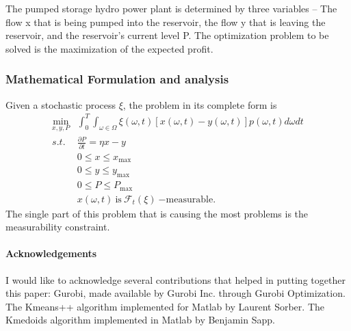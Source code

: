 \documentclass[a4paper, 12pt] {article}
\begin{document}
The pumped storage hydro power plant is determined by three variables – The flow x that is being pumped into the reservoir, the flow y that is leaving the reservoir, and the reservoir's current level P.  The optimization problem to be solved is the maximization of the expected profit. 
\subsubsection{Mathematical Formulation and analysis}
Given a stochastic process $\xi$, the problem in its complete form is
\begin{equation}
  \begin{array}{cc}
    \displaystyle \min_{x,y,P} &\displaystyle\int_0^T \int_{\omega \in\Omega}\xi(\omega,t)\left[x(\omega,t)-y(\omega,t)\right]p(\omega,t)d\omega dt\\
    s.t.& \displaystyle\frac{\partial P}{\partial t} = \eta x -y\\
    &0\leq x \leq x_{\mathrm{max}}\\
    &0\leq y \leq y_{\mathrm{max}}\\
    &0\leq P \leq P_{\mathrm{max}}\\
    &\displaystyle x(\omega, t)\:\mathrm{ is }\:\mathcal{F}_t(\xi)\:\mathrm{ - measurable.}
  \end{array}
\end{equation}
The single part of this problem that is causing the most problems is the measurability constraint. 
\paragraph{Acknowledgements}
I would like to acknowledge several contributions that helped in putting together this paper: Gurobi, made available by Gurobi Inc. through Gurobi Optimization. The Kmeans++ algorithm implemented for Matlab by Laurent Sorber. The Kmedoids algorithm implemented in Matlab by Benjamin Sapp.
\newpage


\end{document}
